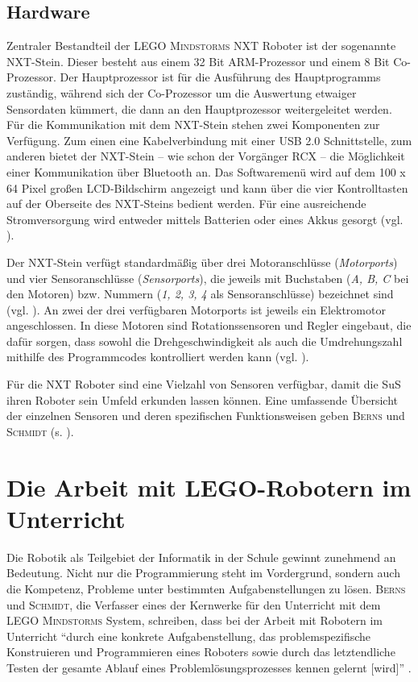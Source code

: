 \documentclass[paper=a4, DIV=calc, BCOR=12mm, twoside=on, onecolumn=on, open = right, titlepage =on, parskip =half-, headsepline = on, footsepline = off, chapterprefix = off, appendixprefix = on, fontsize = 12pt, numbers = noenddot, abstract = on]{scrbook}
\begin{document}
\subsection{Hardware}
\onehalfspacing
Zentraler Bestandteil der \textsc{LEGO Mindstorms} NXT Roboter ist der sogenannte NXT-Stein. Dieser besteht aus einem 32 Bit ARM-Prozessor und einem 8 Bit Co-Prozessor. Der Hauptprozessor ist für die Ausführung des Hauptprogramms zuständig, während sich der Co-Prozessor um die Auswertung etwaiger Sensordaten kümmert, die dann an den Hauptprozessor weitergeleitet werden. Für die Kommunikation mit dem NXT-Stein stehen zwei Komponenten zur Verfügung. Zum einen eine Kabelverbindung mit einer USB 2.0 Schnittstelle, zum anderen bietet der NXT-Stein -- wie schon der Vorgänger RCX -- die Möglichkeit einer Kommunikation über Bluetooth an. Das Softwaremenü wird auf dem 100 x 64 Pixel großen LCD-Bildschirm angezeigt und kann über die vier Kontrolltasten auf der Oberseite des NXT-Steins bedient werden. Für eine ausreichende Stromversorgung wird entweder mittels Batterien oder eines Akkus gesorgt (vgl. \cite[S.42]{berns:10}).

Der NXT-Stein verfügt standardmäßig über drei Motoranschlüsse (\emph{Motorports}) und vier Sensoranschlüsse (\emph{Sensorports}), die jeweils mit Buchstaben (\emph{A, B, C} bei den Motoren) bzw. Nummern (\emph{1, 2, 3, 4} als Sensoranschlüsse) bezeichnet sind (vgl.  \cite[S.43]{berns:10}). An zwei der drei verfügbaren Motorports ist jeweils ein Elektromotor angeschlossen. In diese Motoren sind Rotationssensoren und Regler eingebaut, die dafür sorgen, dass sowohl die Drehgeschwindigkeit als auch die Umdrehungszahl mithilfe des Programmcodes kontrolliert werden kann (vgl. \cite[S.45--47]{berns:10}).

Für die NXT Roboter sind eine Vielzahl von Sensoren verfügbar, damit die SuS ihren Roboter sein Umfeld erkunden lassen können. Eine umfassende Übersicht der einzelnen Sensoren und deren spezifischen Funktionsweisen geben \textsc{Berns} und \textsc{Schmidt} (s. \cite[Kapitel 4.2]{berns:10}). 

\par \singlespacing
 \section{Die Arbeit mit LEGO-Robotern im Unterricht}
\onehalfspacing
Die Robotik als Teilgebiet der Informatik in der Schule gewinnt zunehmend an Bedeutung. Nicht nur die Programmierung steht im Vordergrund, sondern auch die Kompetenz, Probleme unter bestimmten Aufgabenstellungen zu lösen. \textsc{Berns} und \textsc{Schmidt}, die Verfasser eines der Kernwerke für den Unterricht mit dem \textsc{LEGO Mindstorms} System, schreiben, dass bei der Arbeit mit Robotern im Unterricht "`durch eine konkrete Aufgabenstellung, das problemspezifische Konstruieren und Programmieren eines Roboters sowie durch das letztendliche Testen der gesamte Ablauf eines Problemlösungsprozesses kennen gelernt [wird]"' \cite[S.2]{berns:10}.
\end{document}
